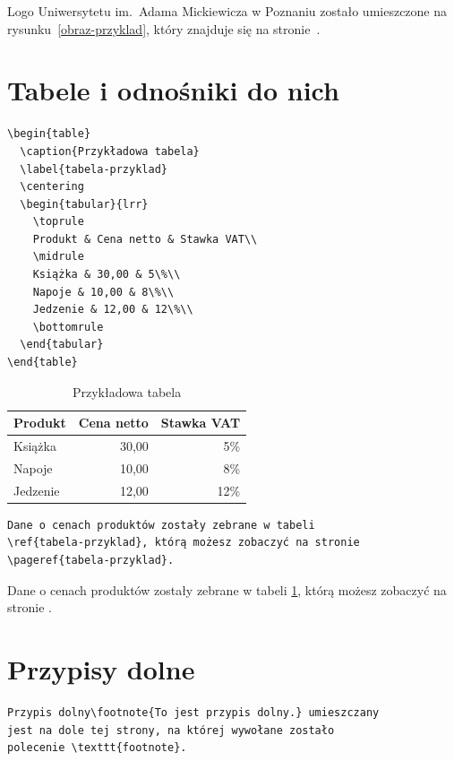 \documentclass[oneside]{amuthesis}
\begin{document}
\noindent Logo Uniwersytetu im.~Adama Mickiewicza w Poznaniu zostało
umieszczone na rysunku~\ref{obraz-przyklad}, który znajduje się
na stronie~\pageref{obraz-przyklad}.

\section{Tabele i odnośniki do nich}

\begin{verbatim}
\begin{table}
  \caption{Przykładowa tabela}
  \label{tabela-przyklad}
  \centering
  \begin{tabular}{lrr}
    \toprule
    Produkt & Cena netto & Stawka VAT\\
    \midrule
    Książka & 30,00 & 5\%\\
    Napoje & 10,00 & 8\%\\
    Jedzenie & 12,00 & 12\%\\
    \bottomrule
  \end{tabular}
\end{table}
\end{verbatim}

\begin{table}[h]
  \caption{Przykładowa tabela}
  \label{tabela-przyklad}
  \centering
  \begin{tabular}{lrr}
    \toprule
    Produkt & Cena netto & Stawka VAT\\
    \midrule
    Książka & 30,00 & 5\%\\
    Napoje & 10,00 & 8\%\\
    Jedzenie & 12,00 & 12\%\\
    \bottomrule
  \end{tabular}
\end{table}

\begin{verbatim}
Dane o cenach produktów zostały zebrane w tabeli
\ref{tabela-przyklad}, którą możesz zobaczyć na stronie
\pageref{tabela-przyklad}.
\end{verbatim}

\noindent Dane o cenach produktów zostały zebrane w tabeli
\ref{tabela-przyklad}, którą możesz zobaczyć na stronie
\pageref{tabela-przyklad}.

\section{Przypisy dolne}

\begin{verbatim}
Przypis dolny\footnote{To jest przypis dolny.} umieszczany
jest na dole tej strony, na której wywołane zostało
polecenie \texttt{footnote}.
\end{verbatim}
\end{document}
